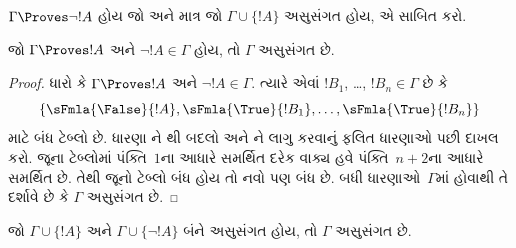 \begin{prob}
$\Gamma \Proves \lnot !A$ હોય જો અને માત્ર જો
$\Gamma \cup \{!A\}$ અસુસંગત હોય, એ સાબિત કરો.
\end{prob}

\begin{prop}
  જો $\Gamma \Proves !A$ અને $\lnot !A \in \Gamma$ હોય, તો $\Gamma$
  અસુસંગત છે.
\end{prop}

\begin{proof}
  ધારો કે $\Gamma \Proves !A$ અને $\lnot !A \in \Gamma$. ત્યારે એવાં
  $!B_1$, \dots, $!B_n \in \Gamma$ છે કે
  \[
  \{\sFmla{\False}{!A}, \sFmla{\True}{!B_1}, \dots, \sFmla{\True}{!B_n}\}
  \]
  માટે બંધ ટેબ્લો છે. ધારણા ને
  થી બદલો અને ને
  \TRule{\True}{\lnot} લાગુ કરવાનું ફલિત ધારણાઓ પછી દાખલ કરો. જૂના
  ટેબ્લોમાં પંક્તિ~$1$ના આધારે સમર્થિત દરેક વાક્ય હવે
  પંક્તિ~$n+2$ના આધારે સમર્થિત છે. તેથી જૂનો ટેબ્લો બંધ હોય તો
  નવો પણ બંધ છે. બધી ધારણાઓ~$\Gamma$માં હોવાથી તે દર્શાવે છે કે
  $\Gamma$ અસુસંગત છે.
\end{proof}

\begin{prop}
  જો $\Gamma \cup \{!A\}$ અને $\Gamma \cup \{\lnot !A\}$ બંને
  અસુસંગત હોય, તો $\Gamma$ અસુસંગત છે.
\end{prop}

